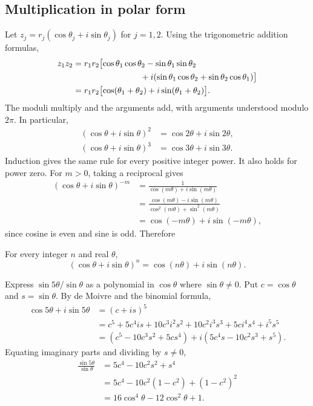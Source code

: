 \subsection{Multiplication in polar form}
Let $z_j=r_j(\cos\theta_j+i\sin\theta_j)$ for $j=1,2$.
Using the trigonometric addition formulas,
\begin{align*}
 z_1z_2
 &=r_1r_2\bigl[\cos\theta_1\cos\theta_2-\sin\theta_1\sin\theta_2\\
 &\hspace{28mm}+i(\sin\theta_1\cos\theta_2+\sin\theta_2\cos\theta_1)\bigr]\\
 &=r_1r_2\bigl[\cos(\theta_1+\theta_2)+i\sin(\theta_1+\theta_2)\bigr].
\end{align*}
The moduli multiply and the arguments add, with arguments understood modulo $2\pi$.
In particular,
\begin{align*}
 (\cos\theta+i\sin\theta)^2&=\cos2\theta+i\sin2\theta,\\
 (\cos\theta+i\sin\theta)^3&=\cos3\theta+i\sin3\theta.
\end{align*}
Induction gives the same rule for every positive integer power. It also holds
for power zero. For $m>0$, taking a reciprocal gives
\begin{align*}
 (\cos\theta+i\sin\theta)^{-m}
 &=\frac1{\cos(m\theta)+i\sin(m\theta)}\\
 &=\frac{\cos(m\theta)-i\sin(m\theta)}{\cos^2(m\theta)+\sin^2(m\theta)}\\
 &=\cos(-m\theta)+i\sin(-m\theta),
\end{align*}
since cosine is even and sine is odd. Therefore
\begin{theorem}
For every integer $n$ and real $\theta$,
\[
 \boxed{(\cos\theta+i\sin\theta)^n=\cos(n\theta)+i\sin(n\theta)}.
\]
\end{theorem}

\begin{example}
Express $\sin5\theta/\sin\theta$ as a polynomial in $\cos\theta$
where $\sin\theta\ne0$.
Put $c=\cos\theta$ and $s=\sin\theta$. By de Moivre and the binomial formula,
\begin{align*}
 \cos5\theta+i\sin5\theta
 &=(c+is)^5\\
 &=c^5+5c^4is+10c^3i^2s^2+10c^2i^3s^3+5ci^4s^4+i^5s^5\\
 &=(c^5-10c^3s^2+5cs^4)+i(5c^4s-10c^2s^3+s^5).
\end{align*}
Equating imaginary parts and dividing by $s\ne0$,
\begin{align*}
 \frac{\sin5\theta}{\sin\theta}
 &=5c^4-10c^2s^2+s^4\\
 &=5c^4-10c^2(1-c^2)+(1-c^2)^2\\
 &=\boxed{16\cos^4\theta-12\cos^2\theta+1}.
\end{align*}
\end{example}

